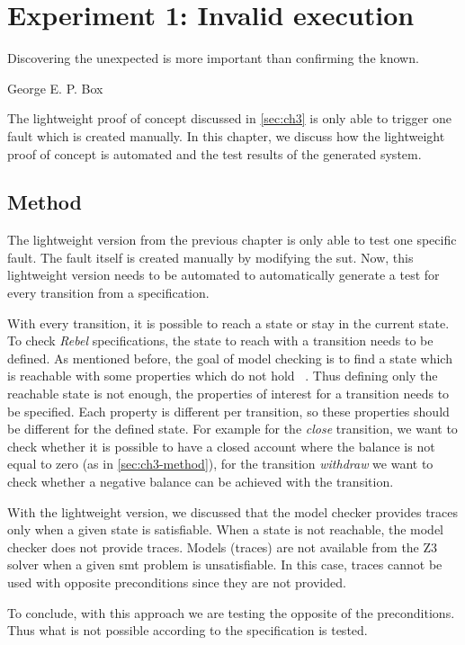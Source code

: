\chapter{Experiment 1: Invalid execution}\label{sec:ch4}

\epigraph{Discovering the unexpected is more important than confirming the
known.}{George E. P. Box}

The lightweight proof of concept discussed in \autoref{sec:ch3} is only able
to trigger one fault which is created manually. In this chapter, we discuss how
the lightweight proof of concept is automated and the test results of the
generated system.

\section{Method}

The lightweight version from the previous chapter is only able to test one specific
fault. The fault itself is created manually by modifying the \gls{sut}. Now,
this lightweight version needs to be automated to automatically generate a test
for every transition from a specification.

With every transition, it is possible to reach a state or stay in the current
state. To check \textit{Rebel} specifications, the state to reach with a transition needs
to be defined. As mentioned before, the goal of model checking is to find a
state which is reachable with some properties which do not hold
~\cite[p.~5]{stoel_storm_vinju_bosman_2016}. Thus defining only the reachable
state is not enough, the properties of interest for a transition needs to be
specified. Each property is different per transition, so these properties should
be different for the defined state. For example for the \textit{close}
transition, we want to check whether it is possible to have a closed account
where the balance is not equal to zero (as in \autoref{sec:ch3-method}),
for the transition \textit{withdraw} we want to check whether a negative balance
can be achieved with the transition.

With the lightweight version, we discussed that the model checker provides traces
only when a given state is satisfiable. When a state is not reachable, the model
checker does not provide traces. Models (traces) are not available from the Z3
solver when a given \gls{smt} problem is unsatisfiable. In this case, traces
cannot be used with opposite preconditions since they are not provided.

To conclude, with this approach we are testing the opposite of the preconditions.
Thus what is not possible according to the specification is tested.

